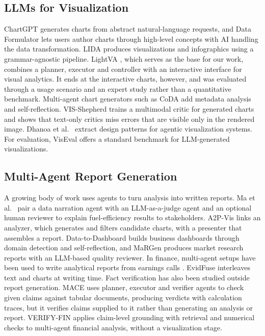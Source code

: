 \documentclass[conference]{IEEEtran}
\begin{document}
\subsection{LLMs for Visualization}
ChartGPT \cite{tian2024chartgpt} generates charts from abstract natural-language requests, and Data Formulator \cite{wang2023dataformulator} lets users author charts through high-level concepts with AI handling the data transformation. LIDA \cite{dibia2023lida} produces visualizations and infographics using a grammar-agnostic pipeline. LightVA \cite{zhao2024lightva}, which serves as the base for our work, combines a planner, executor and controller with an interactive interface for visual analytics. It ends at the interactive charts, however, and was evaluated through a usage scenario and an expert study rather than a quantitative benchmark. Multi-agent chart generators such as CoDA \cite{chen2025coda} add metadata analysis and self-reflection. VIS-Shepherd \cite{pan2025visshepherd} trains a multimodal critic for generated charts and shows that text-only critics miss errors that are visible only in the rendered image. Dhanoa et al.\ \cite{dhanoa2025agenticvis} extract design patterns for agentic visualization systems. For evaluation, VisEval \cite{chen2025viseval} offers a standard benchmark for LLM-generated visualizations.

\subsection{Multi-Agent Report Generation}
A growing body of work uses agents to turn analysis into written reports. Ma et al.\ \cite{ma2025fuel} pair a data narration agent with an LLM-as-a-judge agent and an optional human reviewer to explain fuel-efficiency results to stakeholders. A2P-Vis \cite{gan2025a2pvis} links an analyzer, which generates and filters candidate charts, with a presenter that assembles a report. Data-to-Dashboard \cite{zhang2025d2d} builds business dashboards through domain detection and self-reflection, and MaRGen \cite{koshkin2025margen} produces market research reports with an LLM-based quality reviewer. In finance, multi-agent setups have been used to write analytical reports from earnings calls \cite{goldsack2024earnings,satapathy2025earnings}. EvidFuse \cite{evidfuse2026} interleaves text and charts at writing time. Fact verification has also been studied outside report generation. MACE \cite{mace2026} uses planner, executor and verifier agents to check given claims against tabular documents, producing verdicts with calculation traces, but it verifies claims supplied to it rather than generating an analysis or report. VERIFY-FIN \cite{verifyfin} applies claim-level grounding with retrieval and numerical checks to multi-agent financial analysis, without a visualization stage.
\end{document}
